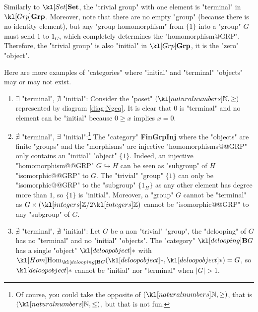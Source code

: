 \documentclass[main.tex]{subfiles}
\begin{document}
\begin{exmp}[$\catGrp$]
	Similarly to $\catSet$, the "trivial group" with one element is "terminal" in $\catGrp$. Moreover, note that there are no empty "group" (because there is no identity element), but any "group homomorphism" from $\{1\}$ into a "group" $G$ must send $1$ to $1_G$, which completely determines the "homomorphism@GRP". Therefore, the "trivial group" is also "initial" in $\catGrp$, it is the "zero" "object".
\end{exmp}
\begin{exmps}
	Here are more examples of "categories" where "initial" and "terminal" "objects" may or may not exist.
	\begin{enumerate}
		\begin{marginfigure}[3\baselineskip]
			\begin{equation}\label{diag:Ngeq}
				\begin{tikzcd}
				\stackrel{0}{\bullet}  & \arrow[l] \stackrel{1}{\bullet}  & \arrow[l] \stackrel{2}{\bullet}  & \arrow[l] \cdots
				\end{tikzcd}
			\end{equation}
		\end{marginfigure}
		\item $\exists$ "terminal", $\nexists$ "initial": Consider the "poset" $(\N, \geq)$ represented by diagram \eqref{diag:Ngeq}. It is clear that $0$ is "terminal" and no element can be "initial" because $0 \geq x$ implies $x = 0$.
		
		\item %
		$\nexists$ "terminal", $\exists$ "initial":\footnote{Of course, you could take the opposite of $(\N, \geq)$, that is $(\N, \leq)$, but that is not fun.} The "category" \textbf{FinGrpInj} where the "objects" are finite "groups" and the "morphisms" are injective "homomorphisms@@GRP" only contains an "initial" "object" $\{1\}$. Indeed, an injective "homomorphism@@GRP" $G \hookrightarrow H$ can be seen as "subgroup" of $H$ "isomorphic@@GRP" to $G$. The "trivial" "group" $\{1\}$ can only be "isomorphic@@GRP" to the "subgroup" $\{1_H\}$ as any other element has degree more than $1$, so $\{1\}$ is "initial". Moreover, a "group" $G$ cannot be "terminal" as $G \times (\Z/2\Z)$ cannot be "isomorphic@@GRP" to any "subgroup" of $G$.
		\item $\nexists$ "terminal", $\nexists$ "initial": Let $G$ be a non "trivial" "group", the "delooping" of $G$ has no "terminal" and no "initial" "objects". The "category" $\deloop{G}$ has a single "object" $\deloopobject$ with $\Hom_{\deloop{G}}(\deloopobject, \deloopobject) = G$, so $\deloopobject$ cannot be "initial" nor "terminal" when $|G| > 1$.
		

\end{enumerate}
\end{exmps}
\end{document}
